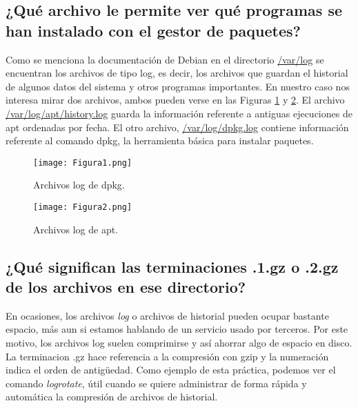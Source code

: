 \subsection{¿Qué archivo le permite ver qué programas se han instalado con el gestor de paquetes?}

Como se menciona la documentación de Debian\cite{logpack} en el directorio \url{/var/log} se encuentran los archivos de tipo log, es decir, los archivos que guardan el 
historial de algunos datos del sistema y otros programas importantes. En nuestro caso nos interesa mirar dos archivos, ambos pueden verse en las 
Figuras \ref{fig:figura1} y \ref{fig:figura2}.  El archivo \url{/var/log/apt/history.log} guarda la información referente a antiguas ejecuciones de apt ordenadas por fecha.
El otro archivo, \url{/var/log/dpkg.log} contiene información referente al comando dpkg, la herramienta básica para instalar paquetes.

\begin{figure}[H] 
\centering
\texttt{[image: Figura1.png]}  
\caption{Archivos log de dpkg.}\label{fig:figura1}
\end{figure}

\begin{figure}[H] 
\centering
\texttt{[image: Figura2.png]}  
\caption{Archivos log de apt.}\label{fig:figura2}
\end{figure}


\subsection{¿Qué significan las terminaciones .1.gz o .2.gz de los archivos en ese directorio?}

En ocasiones, los archivos \textit{log} o archivos de historial pueden ocupar bastante espacio, más aun si estamos hablando de un servicio usado por terceros. Por este
motivo, los archivos log suelen comprimirse y así ahorrar algo de espacio en disco. La terminacion .gz hace referencia a la compresión con gzip y la numeración indica
el orden de antigüedad. Como ejemplo de esta práctica, podemos ver el comando \textit{logrotate}\cite{logrotate}, útil cuando se quiere administrar de forma rápida y 
automática la compresión de archivos de historial.



